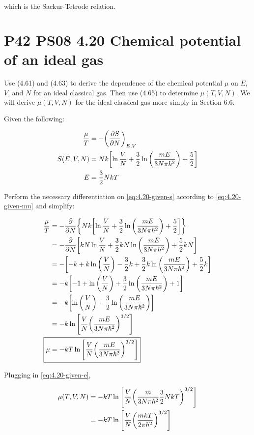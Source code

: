 \documentclass[9pt,a4paper,twocolumn]{article}
\begin{document}
which is the Sackur-Tetrode relation.

\section{P42 PS08 4.20 Chemical potential of an ideal gas}
Use (4.61) and (4.63) to derive the dependence of the chemical potential $\mu$ on $E$, $V$, and $N$ for an ideal classical gas. Then use (4.65) to determine $\mu(T, V,N)$. We will derive $\mu(T, V,N)$ for the ideal classical gas more simply in Section 6.6.

Given the following:

\begin{align}
	\frac{\mu}{T} &= -\qty(\pdv{S}{N})_{E,V} \label{eq:4.20-given-mu} \\
	S(E,V,N) &= Nk\qty[\ln\frac{V}{N} + \frac{3}{2}\ln\qty(\frac{mE}{3N\pi\hbar^2}) + \frac{5}{2}] \label{eq:4.20-given-s} \\
	E &= \frac{3}{2}NkT \label{eq:4.20-given-e}
\end{align}

Perform the necessary differentiation on \eqref{eq:4.20-given-s} according to \eqref{eq:4.20-given-mu} and simplify:

\begin{align}
	\frac{\mu}{T} &= -\pdv{N} \qty{Nk\qty[\ln\frac{V}{N} + \frac{3}{2}\ln\qty(\frac{mE}{3N\pi\hbar^2}) + \frac{5}{2}]} \\
	&= -\pdv{N} \qty[kN\ln\frac{V}{N} + \frac{3}{2}kN\ln\qty(\frac{mE}{3N\pi\hbar^2}) + \frac{5}{2}kN] \\
	&= -\qty[-k + k\ln\qty(\frac{V}{N}) - \frac{3}{2}k + \frac{3}{2}k\ln\qty(\frac{mE}{3N\pi\hbar^2}) + \frac{5}{2}k] \\
	&= -k\qty[-1 + \ln\qty(\frac{V}{N}) + \frac{3}{2}\ln\qty(\frac{mE}{3N\pi\hbar^2}) + 1] \\
	&= -k\qty[\ln\qty(\frac{V}{N}) + \frac{3}{2}\ln\qty(\frac{mE}{3N\pi\hbar^2})] \\
	&= -k\ln\qty[\frac{V}{N}\qty(\frac{mE}{3N\pi\hbar^2})^{3/2}] \\
	\Aboxed{
		\mu &= -kT\ln\qty[\frac{V}{N}\qty(\frac{mE}{3N\pi\hbar^2})^{3/2}]
	} \label{eq:4.20-answer-1}
\end{align}

Plugging in \eqref{eq:4.20-given-e},

\begin{align}
	\mu(T,V,N) &= -kT\ln\qty[\frac{V}{N}\qty(\frac{m}{3N\pi\hbar^2}\frac{3}{2}NkT)^{3/2}] \\
	&= -kT\ln\qty[\frac{V}{N}\qty(\frac{mkT}{2\pi\hbar^2})^{3/2}]
\end{align}
\end{document}
